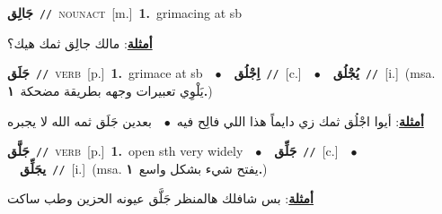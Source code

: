 \documentclass[10pt,a4paper,twoside]{article} %
\begin{document}
\begin{multicols}{2}
{\setlength\topsep{0pt}\textbf{\foreignlanguage{arabic}{جَالِق}}\ {\color{gray}\texttt{//}\color{black}}\ \textsc{noun\textunderscore act}\ [m.]\ \textbf{1.}~grimacing at sb\  \begin{flushright}\color{gray}\foreignlanguage{arabic}{\textbf{\underline{\foreignlanguage{arabic}{أمثلة}}}: مالك جالِق ثمك هيك؟}\end{flushright}\color{black}} \vspace{2mm}

{\setlength\topsep{0pt}\textbf{\foreignlanguage{arabic}{جَلَق}}\ {\color{gray}\texttt{//}\color{black}}\ \textsc{verb}\ [p.]\ \textbf{1.}~grimace at sb\ \ $\bullet$\ \ \setlength\topsep{0pt}\textbf{\foreignlanguage{arabic}{اِجْلُق}}\ {\color{gray}\texttt{//}\color{black}}\ [c.]\ \ $\bullet$\ \ \setlength\topsep{0pt}\textbf{\foreignlanguage{arabic}{يُجْلُق}}\ {\color{gray}\texttt{//}\color{black}}\ [i.]\ \color{gray}(msa. \foreignlanguage{arabic}{يَلْوِي تعبيرات وجهه بطريقة مضحكة}~\foreignlanguage{arabic}{\textbf{١.}})\color{black}\  \begin{flushright}\color{gray}\foreignlanguage{arabic}{\textbf{\underline{\foreignlanguage{arabic}{أمثلة}}}: أيوا اجْلُق ثمك زي دايماً هذا اللي فالِح فيه\ $\bullet$\ \  بعدين جَلَق ثمه الله لا يجبره}\end{flushright}\color{black}} \vspace{2mm}

{\setlength\topsep{0pt}\textbf{\foreignlanguage{arabic}{جَلَّق}}\ {\color{gray}\texttt{//}\color{black}}\ \textsc{verb}\ [p.]\ \textbf{1.}~open sth very widely\ \ $\bullet$\ \ \setlength\topsep{0pt}\textbf{\foreignlanguage{arabic}{جَلِّق}}\ {\color{gray}\texttt{//}\color{black}}\ [c.]\ \ $\bullet$\ \ \setlength\topsep{0pt}\textbf{\foreignlanguage{arabic}{يجَلِّق}}\ {\color{gray}\texttt{//}\color{black}}\ [i.]\ \color{gray}(msa. \foreignlanguage{arabic}{يفتح شيء بشكل واسع}~\foreignlanguage{arabic}{\textbf{١.}})\color{black}\  \begin{flushright}\color{gray}\foreignlanguage{arabic}{\textbf{\underline{\foreignlanguage{arabic}{أمثلة}}}: بس شافلك هالمنظر جَلَّق عيونه الحزين وطب ساكت}\end{flushright}\color{black}} \vspace{2mm}


\end{multicols}
\end{document}
